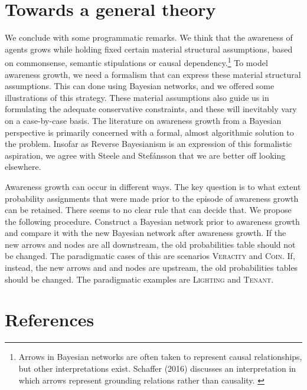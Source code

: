 \documentclass[
  11pt,
  dvipsnames,enabledeprecatedfontcommands]{scrartcl}
\begin{document}
\hypertarget{towards-a-general-theory}{%
\section{Towards a general theory}\label{towards-a-general-theory}}

We conclude with some programmatic remarks. We think that the awareness
of agents grows while holding fixed certain material structural
assumptions, based on commonsense, semantic stipulations or causal
dependency.\footnote{Arrows in Bayesian networks are often taken to
  represent causal relationships, but other interpretations exist.
  Schaffer (2016) discusses an interpretation in which arrows represent
  grounding relations rather than causality. \label{footnote:causation}}
To model awareness growth, we need a formalism that can express these
material structural assumptions. This can done using Bayesian networks,
and we offered some illustrations of this strategy. These material
assumptions also guide us in formulating the adequate conservative
constraints, and these will inevitably vary on a case-by-case basis. The
literature on awareness growth from a Bayesian perspective is primarily
concerned with a formal, almost algorithmic solution to the problem.
Insofar as Reverse Bayesianism is an expression of this formalistic
aspiration, we agree with Steele and Stefánsson that we are better off
looking elsewhere.

Awareness growth can occur in different ways. The key question is to
what extent probability assignments that were made prior to the episode
of awareness growth can be retained. There seems to no clear rule that
can decide that. We propose the following procedure. Construct a
Bayesian network prior to awareness growth and compare it with the new
Bayesian network after awareness growth. If the new arrows and nodes are
all downstream, the old probabilities table should not be changed. The
paradigmatic cases of this are scenarios \textsc{Veracity} and
\textsc{Coin}. If, instead, the new arrows and and nodes are upstream,
the old probabilities tables should be changed. The paradigmatic
examples are \textsc{Lighting} and \textsc{Tenant}.

\singlespace

\hypertarget{references}{%
\section*{References}\label{references}}
\end{document}
